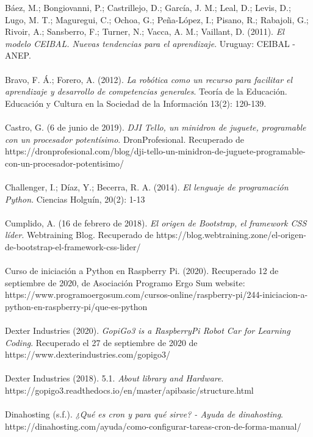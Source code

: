 \documentclass{report}
\begin{document}
Báez, M.; Bongiovanni, P.; Castrillejo, D.; García, J. M.; Leal, D.; Levis, D.; Lugo, M. T.; Maguregui, C.; Ochoa, G.;  Peña-López, I.; Pisano, R.; Rabajoli, G.; Rivoir, A.; Sansberro, F.; Turner, N.; Vacca, A. M.; Vaillant, D. (2011).  \textit{El modelo CEIBAL. Nuevas tendencias para el aprendizaje}. Uruguay: CEIBAL - ANEP.
\\
\\
Bravo, F. Á.; Forero, A. (2012). \textit{La robótica como un recurso para facilitar el aprendizaje y desarrollo de competencias generales}. Teoría de la Educación. Educación y Cultura en la Sociedad de la Información 13(2): 120-139.
\\
\\
Castro, G. (6 de junio de 2019).  \textit{DJI Tello, un minidron de juguete, programable con un procesador potentísimo}. DronProfesional. Recuperado de https://dronprofesional.com/blog/dji-tello-un-minidron-de-juguete-programable-con-un-procesador-potentisimo/
\\
\\
Challenger, I.; Díaz, Y.; Becerra, R. A. (2014). \textit{El lenguaje de programación Python}. Ciencias Holguín, 20(2): 1-13
\\
\\
Cumplido, A. (16 de febrero de 2018).  \textit{El origen de Bootstrap, el framework CSS líder}. Webtraining Blog. Recuperado de https://blog.webtraining.zone/el-origen-de-bootstrap-el-framework-css-lider/
\\
\\
Curso de iniciación a Python en Raspberry Pi. (2020). Recuperado 12 de septiembre de 2020, de Asociación Programo Ergo Sum website: https://www.programoergosum.com/cursos-online/raspberry-pi/244-iniciacion-a-python-en-raspberry-pi/que-es-python
\\
\\
Dexter Industries (2020). \textit{GopiGo3 is a RaspberryPi Robot Car for Learning Coding}. Recuperado el 27 de septiembre de 2020 de https://www.dexterindustries.com/gopigo3/
\\
\\
Dexter  Industries (2018). 5.1.  \textit{About library and Hardware}. https://gopigo3.readthedocs.io/en/master/api\-basic/structure.html
\\
\\
Dinahosting (s.f.). \textit{¿Qué es cron y para qué sirve? - Ayuda de dinahosting}. https://dinahosting.com/ayuda/como-configurar-tareas-cron-de-forma-manual/
\\
\\
\end{document}
